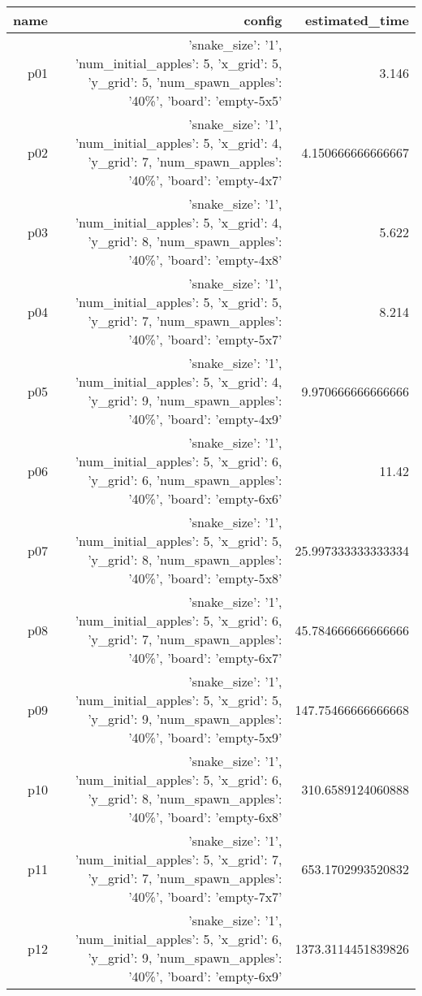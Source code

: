 \documentclass{article}
\begin{document}
                            \begin{center}
                            \scriptsize
                            \begin{tabular}{r|r|r}
                            name & config & estimated\_time\\\midrule
                              p01&{'snake\_size': '1', 'num\_initial\_apples': 5, 'x\_grid': 5, 'y\_grid': 5, 'num\_spawn\_apples': '40\%', 'board': 'empty-5x5'}&3.146\\
  p02&{'snake\_size': '1', 'num\_initial\_apples': 5, 'x\_grid': 4, 'y\_grid': 7, 'num\_spawn\_apples': '40\%', 'board': 'empty-4x7'}&4.150666666666667\\
  p03&{'snake\_size': '1', 'num\_initial\_apples': 5, 'x\_grid': 4, 'y\_grid': 8, 'num\_spawn\_apples': '40\%', 'board': 'empty-4x8'}&5.622\\
  p04&{'snake\_size': '1', 'num\_initial\_apples': 5, 'x\_grid': 5, 'y\_grid': 7, 'num\_spawn\_apples': '40\%', 'board': 'empty-5x7'}&8.214\\
  p05&{'snake\_size': '1', 'num\_initial\_apples': 5, 'x\_grid': 4, 'y\_grid': 9, 'num\_spawn\_apples': '40\%', 'board': 'empty-4x9'}&9.970666666666666\\
  p06&{'snake\_size': '1', 'num\_initial\_apples': 5, 'x\_grid': 6, 'y\_grid': 6, 'num\_spawn\_apples': '40\%', 'board': 'empty-6x6'}&11.42\\
  p07&{'snake\_size': '1', 'num\_initial\_apples': 5, 'x\_grid': 5, 'y\_grid': 8, 'num\_spawn\_apples': '40\%', 'board': 'empty-5x8'}&25.997333333333334\\
  p08&{'snake\_size': '1', 'num\_initial\_apples': 5, 'x\_grid': 6, 'y\_grid': 7, 'num\_spawn\_apples': '40\%', 'board': 'empty-6x7'}&45.784666666666666\\
  p09&{'snake\_size': '1', 'num\_initial\_apples': 5, 'x\_grid': 5, 'y\_grid': 9, 'num\_spawn\_apples': '40\%', 'board': 'empty-5x9'}&147.75466666666668\\
  p10&{'snake\_size': '1', 'num\_initial\_apples': 5, 'x\_grid': 6, 'y\_grid': 8, 'num\_spawn\_apples': '40\%', 'board': 'empty-6x8'}&310.6589124060888\\
  p11&{'snake\_size': '1', 'num\_initial\_apples': 5, 'x\_grid': 7, 'y\_grid': 7, 'num\_spawn\_apples': '40\%', 'board': 'empty-7x7'}&653.1702993520832\\
  p12&{'snake\_size': '1', 'num\_initial\_apples': 5, 'x\_grid': 6, 'y\_grid': 9, 'num\_spawn\_apples': '40\%', 'board': 'empty-6x9'}&1373.3114451839826\\

\end{tabular}
\end{center}
\end{document}
